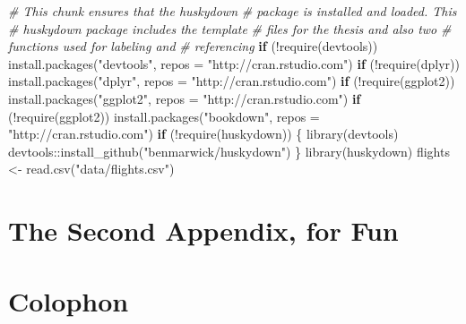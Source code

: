 \documentclass[print]{nuthesis}
\newenvironment{Shaded}{\begin{snugshade}}{\end{snugshade}}
\newcommand{\AttributeTok}[1]{\textcolor[rgb]{0.77,0.63,0.00}{#1}}
\newcommand{\CommentTok}[1]{\textcolor[rgb]{0.56,0.35,0.01}{\textit{#1}}}
\newcommand{\ControlFlowTok}[1]{\textcolor[rgb]{0.13,0.29,0.53}{\textbf{#1}}}
\newcommand{\FunctionTok}[1]{\textcolor[rgb]{0.00,0.00,0.00}{#1}}
\newcommand{\NormalTok}[1]{#1}
\newcommand{\OtherTok}[1]{\textcolor[rgb]{0.56,0.35,0.01}{#1}}
\newcommand{\SpecialCharTok}[1]{\textcolor[rgb]{0.00,0.00,0.00}{#1}}
\newcommand{\StringTok}[1]{\textcolor[rgb]{0.31,0.60,0.02}{#1}}
\begin{document}
\begin{Shaded}
\begin{Highlighting}[]
\CommentTok{\# This chunk ensures that the huskydown}
\CommentTok{\# package is installed and loaded. This}
\CommentTok{\# huskydown package includes the template}
\CommentTok{\# files for the thesis and also two}
\CommentTok{\# functions used for labeling and}
\CommentTok{\# referencing}
\ControlFlowTok{if}\NormalTok{ (}\SpecialCharTok{!}\FunctionTok{require}\NormalTok{(devtools)) }\FunctionTok{install.packages}\NormalTok{(}\StringTok{"devtools"}\NormalTok{,}
    \AttributeTok{repos =} \StringTok{"http://cran.rstudio.com"}\NormalTok{)}
\ControlFlowTok{if}\NormalTok{ (}\SpecialCharTok{!}\FunctionTok{require}\NormalTok{(dplyr)) }\FunctionTok{install.packages}\NormalTok{(}\StringTok{"dplyr"}\NormalTok{,}
    \AttributeTok{repos =} \StringTok{"http://cran.rstudio.com"}\NormalTok{)}
\ControlFlowTok{if}\NormalTok{ (}\SpecialCharTok{!}\FunctionTok{require}\NormalTok{(ggplot2)) }\FunctionTok{install.packages}\NormalTok{(}\StringTok{"ggplot2"}\NormalTok{,}
    \AttributeTok{repos =} \StringTok{"http://cran.rstudio.com"}\NormalTok{)}
\ControlFlowTok{if}\NormalTok{ (}\SpecialCharTok{!}\FunctionTok{require}\NormalTok{(ggplot2)) }\FunctionTok{install.packages}\NormalTok{(}\StringTok{"bookdown"}\NormalTok{,}
    \AttributeTok{repos =} \StringTok{"http://cran.rstudio.com"}\NormalTok{)}
\ControlFlowTok{if}\NormalTok{ (}\SpecialCharTok{!}\FunctionTok{require}\NormalTok{(huskydown)) \{}
    \FunctionTok{library}\NormalTok{(devtools)}
\NormalTok{    devtools}\SpecialCharTok{::}\FunctionTok{install\_github}\NormalTok{(}\StringTok{"benmarwick/huskydown"}\NormalTok{)}
\NormalTok{\}}
\FunctionTok{library}\NormalTok{(huskydown)}
\NormalTok{flights }\OtherTok{\textless{}{-}} \FunctionTok{read.csv}\NormalTok{(}\StringTok{"data/flights.csv"}\NormalTok{)}
\end{Highlighting}
\end{Shaded}

\hypertarget{the-second-appendix-for-fun}{%
\chapter{The Second Appendix, for Fun}\label{the-second-appendix-for-fun}}

\hypertarget{colophon}{%
\chapter*{Colophon}\label{colophon}}
\end{document}
